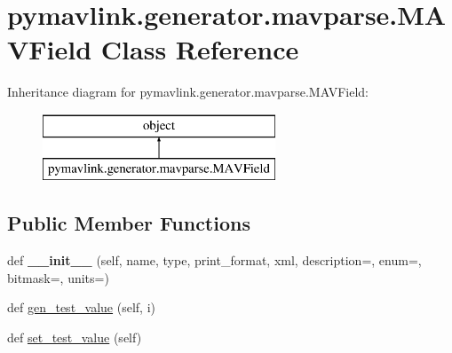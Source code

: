 \hypertarget{classpymavlink_1_1generator_1_1mavparse_1_1MAVField}{}\section{pymavlink.\+generator.\+mavparse.\+M\+A\+V\+Field Class Reference}
\label{classpymavlink_1_1generator_1_1mavparse_1_1MAVField}
Inheritance diagram for pymavlink.\+generator.\+mavparse.\+M\+A\+V\+Field\+:\begin{figure}[H]
\begin{center}
\leavevmode
\includegraphics[height=2.000000cm]{classpymavlink_1_1generator_1_1mavparse_1_1MAVField}
\end{center}
\end{figure}
\subsection*{Public Member Functions}
\begin{DoxyCompactItemize}
\item 
\mbox{\label{classpymavlink_1_1generator_1_1mavparse_1_1MAVField_ad4ea0c025f82f0d142de2176f6333a29}} 
def {\bfseries \+\_\+\+\_\+init\+\_\+\+\_\+} (self, name, type, print\+\_\+format, xml, description=\textquotesingle{}\textquotesingle{}, enum=\textquotesingle{}\textquotesingle{}, bitmask=\textquotesingle{}\textquotesingle{}, units=\textquotesingle{}\textquotesingle{})
\item 
def \hyperlink{classpymavlink_1_1generator_1_1mavparse_1_1MAVField_a2df3d68699c4466c5b0523c7426703e8}{gen\+\_\+test\+\_\+value} (self, i)
\item 
def \hyperlink{classpymavlink_1_1generator_1_1mavparse_1_1MAVField_a8f6649ad27b22034662c7eea24aba304}{set\+\_\+test\+\_\+value} (self)
\end{DoxyCompactItemize}
